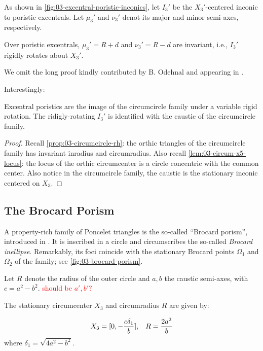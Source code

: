 As shown in \cref{fig:03-excentral-poristic-inconics}, let $I_3'$ be the $X_3'$-centered inconic to poristic excentrals. Let $\mu_3'$ and $\nu_3'$ denot its major and minor semi-axes, respectively.

\begin{proposition}
Over poristic excentrals,  $\mu_3'=R+d$ and $\nu_3'=R-d$ are invariant, i.e., $I_3'$ rigidly rotates about $X_3'$.
\label{prop:03-inconic-x3p}
\end{proposition}

We omit the long proof kindly contributed by B. Odehnal and appearing in \cite[Appendix C]{garcia2020-similarity-I}.

Interestingly:

\begin{theorem}
Excentral poristics are the image of the circumcircle family under a variable rigid rotation. The ridigly-rotating $I_3'$ is identified with the caustic of the circumcircle family.
\end{theorem} 

\begin{proof}
Recall \cref{prop:03-circumcircle-rh}: the orthic triangles of the circumcircle family has invariant inradius and circumradius. Also recall \cref{lem:03-circum-x5-locus}: the locus of the orthic circumcenter is a circle concentric with the common center. Also notice in the circumcircle family, the caustic is the stationary inconic centered on $X_3$.
\end{proof}

\subsection{The Brocard Porism}
 
A property-rich family of Poncelet triangles is the so-called ``Brocard porism'', introduced in  \cite{bradley2007-brocard,shail1996-brocard, bradley2011-brocard}. It is inscribed in a circle and circumscribes the so-called {\em Brocard inellipse}. Remarkably, its foci coincide with the stationary Brocard points $\Omega_1$ and $\Omega_2$ of the family; see \cref{fig:03-brocard-porism}.

Let $R$ denote the radius of the outer circle and $a,b$ the caustic semi-axes, with $c=a^2-b^2$. \textcolor{red}{should be $a',b'$?}

\begin{proposition}
The stationary circumcenter $X_3$ and circumradius $R$ are given by:

\begin{equation}
X_3=[0,-\frac{c\delta_1}{b}],\;\;\;R= \frac{2a^2}{b} \\
 \label{eqn:broc-circumcircle}
\end{equation}
where $\delta_1=\sqrt{4a^2-b^2}$.
\label{prop:cotw}
\end{proposition}

